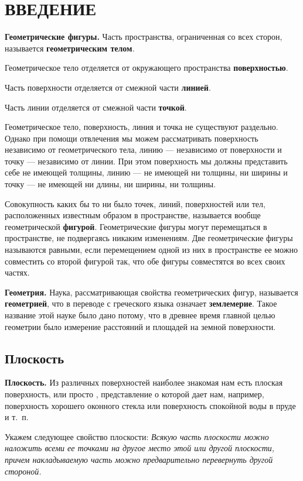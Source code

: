 \documentclass[oneside]{book}
\begin{document}
\section*{ВВЕДЕНИЕ}

\textbf{Геометрические фигуры.}
Часть пространства, ограниченная со всех сторон, называется \textbf{геометрическим телом}.

Геометрическое тело отделяется от окружающего пространства \textbf{поверхностью}.

Часть поверхности отделяется от смежной части \textbf{линией}.

Часть линии отделяется от смежной части \textbf{точкой}.

Геометрическое тело, поверхность, линия и точка не существуют раздельно.
Однако при помощи отвлечения мы можем рассматривать поверхность независимо от геометрического тела, линию — независимо от поверхности и точку — независимо от линии.
При этом поверхность мы должны представить себе не имеющей толщины, линию — не имеющей ни толщины, ни ширины и точку — не имеющей ни длины, ни ширины, ни толщины.

Совокупность каких бы то ни было точек, линий, поверхностей или тел, расположенных известным образом в пространстве, называется вообще геометрической \textbf{фигурой}.
Геометрические фигуры могут перемещаться в пространстве, не подвергаясь никаким изменениям.
Две геометрические фигуры называются равными, если перемещением одной из них в пространстве ее можно совместить со второй фигурой так, что обе фигуры совместятся во всех своих частях.

\textbf{Геометрия.}
Наука, рассматривающая свойства геометрических фигур, называется \textbf{геометрией}, что в переводе с греческого языка означает \textbf{землемерие}.
Такое название этой науке было дано потому, что в древнее время главной целью геометрии было измерение расстояний и площадей на земной поверхности.


\subsection*{Плоскость}

\textbf{Плоскость.}
Из различных поверхностей наиболее знакомая нам есть плоская поверхность, или просто , представление о которой дает нам, например, поверхность хорошего оконного стекла или поверхность спокойной воды в пруде и т.~п.

Укажем следующее свойство плоскости:
\textit{Всякую часть плоскости можно наложить всеми ее точками на другое место этой или другой плоскости, причем накладываемую часть можно предварительно перевернуть другой стороной.}
\end{document}
